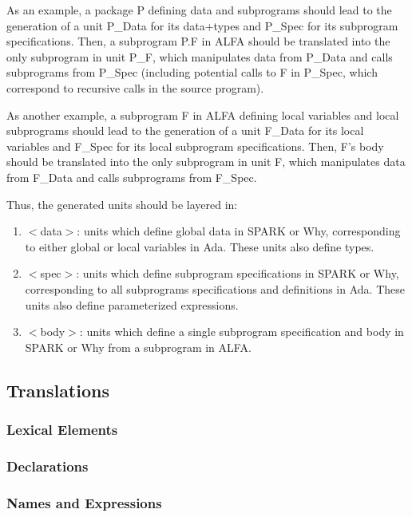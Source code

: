 \documentclass{article}
\begin{document}
As an example, a package P defining data and subprograms should lead to the
generation of a unit P\_Data for its data+types and P\_Spec for its subprogram
specifications. Then, a subprogram P.F in ALFA should be translated into the
only subprogram in unit P\_F, which manipulates data from P\_Data and calls
subprograms from P\_Spec (including potential calls to F in P\_Spec, which
correspond to recursive calls in the source program).

As another example, a subprogram F in ALFA defining local variables and local
subprograms should lead to the generation of a unit F\_Data for its local
variables and F\_Spec for its local subprogram specifications. Then, F's body
should be translated into the only subprogram in unit F, which manipulates data
from F\_Data and calls subprograms from F\_Spec.

Thus, the generated units should be layered in:
\begin{enumerate}
\item $<$data$>$: units which define global data in SPARK or Why, corresponding
  to either global or local variables in Ada. These units also define types.
\item $<$spec$>$: units which define subprogram specifications in SPARK or Why,
  corresponding to all subprograms specifications and definitions in Ada. These
  units also define parameterized expressions.
\item $<$body$>$: units which define a single subprogram specification and body
  in SPARK or Why from a subprogram in ALFA.
\end{enumerate}

\subsection{Translations}

\subsubsection{Lexical Elements}

\subsubsection{Declarations}

\subsubsection{Names and Expressions}
\end{document}

